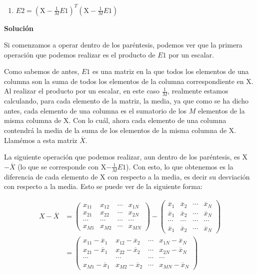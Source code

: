 \documentclass[11pt,a4paper]{article}
\newcommand{\answer}{\noindent\textbf{Solución}}
\begin{document}
\begin{enumerate}[resume,label=\textit{\alph*})]
	\item $E2 = (\text{X} - \frac{1}{M}E1)^T(\text{X} - \frac{1}{M}E1)$
\end{enumerate}

\answer

Si comenzamos a operar dentro de los paréntesis, podemos ver que la primera operación que podemos realizar es el producto
de $E1$ por un escalar.

Como sabemos de antes, $E1$ es una matriz en la que todos los elementos de una columna son la suma de todos los elementos de
la columna correspondiente en X. Al realizar el producto por un escalar, en este caso $\frac{1}{M}$, realmente estamos
calculando, para cada elemento de la matriz, la media, ya que como se ha dicho antes, cada elemento de una columna es el
sumatorio de los $M$ elementos de la misma columna de X. Con lo cuál, ahora cada elemento de una columna contendrá la media
de la suma de los elementos de la misma columna de X. Llamémos a esta matriz $\overline{X}$.

La siguiente operación que podemos realizar, aun dentro de los paréntesis, es X$- \overline{X}$ (lo que se corresponde con
X$- \frac{1}{M}E1$). Con esto, lo que obtenemos es la diferencia de cada elemento de X con respecto a la media, es decir
su desviación con respecto a la media. Esto se puede ver de la siguiente forma:

\begin{equation}
\begin{split}
X - \overline{X} &=
\left(
{
\begin{array}{cccc}
	x_{11} & x_{12} & \cdots & x_{1N} \\
	x_{21} & x_{22} & \cdots & x_{2N} \\
	\cdots & \cdots & \cdots & \cdots \\
	x_{M1} & x_{M2} & \cdots & x_{MN}
\end{array}
}
\right)
-
\left(
{
\begin{array}{cccc}
	\overline{x}_{1} & \overline{x}_{2} & \cdots & \overline{x}_{N} \\
	\overline{x}_{1} & \overline{x}_{2} & \cdots & \overline{x}_{N} \\
	\cdots & \cdots & \cdots & \cdots \\
	\overline{x}_{1} & \overline{x}_{2} & \cdots & \overline{x}_{N}
\end{array}
}
\right) \\
&=
\left(
{
\begin{array}{cccc}
	x_{11} - \overline{x}_{1} & x_{12} - \overline{x}_{2} & \cdots & x_{1N} - \overline{x}_{N} \\
	x_{21} - \overline{x}_{1} & x_{22} - \overline{x}_{2} & \cdots & x_{2N} - \overline{x}_{N} \\
	\cdots & \cdots & \cdots & \cdots \\
	x_{M1} - \overline{x}_{1} & x_{M2} - \overline{x}_{2} & \cdots & x_{MN} - \overline{x}_{N}
\end{array}
}
\right)
\end{split}
\end{equation}
\end{document}
